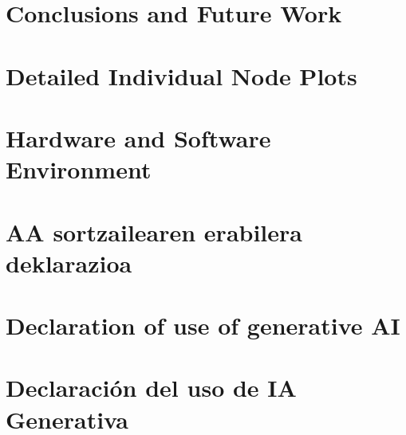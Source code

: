 \documentclass[a4paper, 11pt, showtrims]{memoir}
\newcommand{\english}{}
\begin{document}
\chapter{Conclusions and Future Work}\label{ch:conclusions}

\cleardoublepage
 
 
\addappheadtotoc
\appendix
 
\chapter{Detailed Individual Node Plots} \label{app:detailed_plots}

\cleardoublepage

\chapter{Hardware and Software Environment} \label{app:hardware_software}

\cleardoublepage


\ifdefined\euskaraz
\chapter{AA sortzailearen erabilera deklarazioa} \label{ch:deklarazioa}

\else\ifdefined\english
\chapter{Declaration of use of generative AI} \label{ch:declaration}

\else
\chapter{Declaración del uso de IA Generativa} \label{ch:declaracion}

\fi\fi
 
 



 
\end{document}
